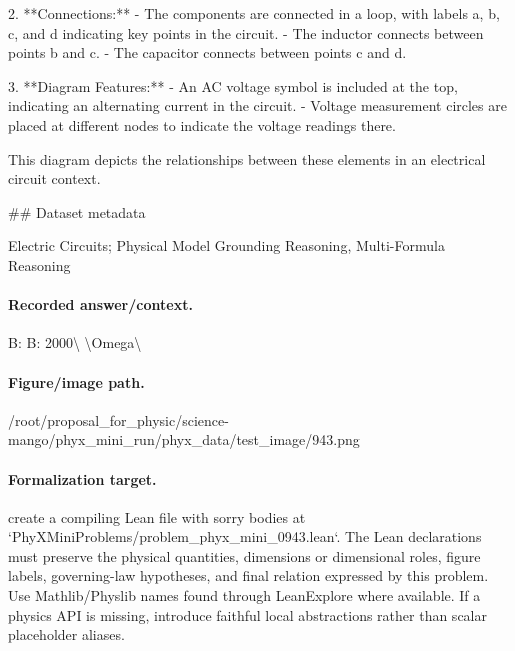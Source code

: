 2. **Connections:**
   - The components are connected in a loop, with labels a, b, c, and d indicating key points in the circuit.
   - The inductor connects between points b and c.
   - The capacitor connects between points c and d.

3. **Diagram Features:**
   - An AC voltage symbol is included at the top, indicating an alternating current in the circuit.
   - Voltage measurement circles are placed at different nodes to indicate the voltage readings there.

This diagram depicts the relationships between these elements in an electrical circuit context.

\#\# Dataset metadata

Electric Circuits; Physical Model Grounding Reasoning, Multi-Formula Reasoning

\paragraph{Recorded answer/context.}
B: B: 2000\textbackslash{} \textbackslash{}Omega\textbackslash{}

\paragraph{Figure/image path.}
/root/proposal\_for\_physic/science-mango/phyx\_mini\_run/phyx\_data/test\_image/943.png

\paragraph{Formalization target.}
create a compiling Lean file with sorry bodies at `PhyXMiniProblems/problem\_phyx\_mini\_0943.lean`. The Lean declarations must preserve the physical quantities, dimensions or dimensional roles, figure labels, governing-law hypotheses, and final relation expressed by this problem.
Use Mathlib/Physlib names found through LeanExplore where available. If a physics API is missing, introduce faithful local abstractions rather than scalar placeholder aliases.

